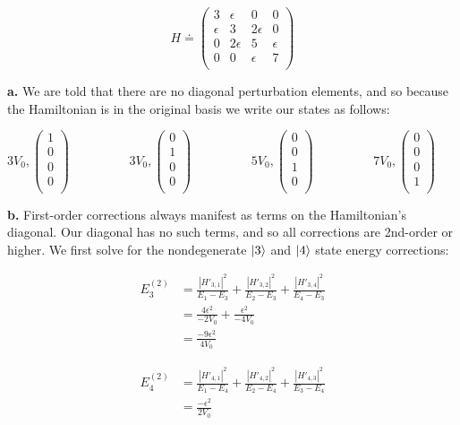 \documentclass[10pt]{article} %
\begin{document}
\begin{equation*}
  H \doteq
  \begin{pmatrix}
    3 & \epsilon & 0 & 0\\
    \epsilon & 3 & 2\epsilon & 0\\
    0 & 2\epsilon & 5 & \epsilon\\
    0 & 0 & \epsilon & 7\\
  \end{pmatrix}
\end{equation*}

\textbf{a.}
We are told that there are no diagonal perturbation elements, and so because the Hamiltonian is in
the original basis we write our states as follows:

\begin{equation*}
  3V_0,
  \begin{pmatrix}
    1 \\ 0 \\ 0 \\ 0\\
  \end{pmatrix}
  \hspace{2cm}
  3V_0,
  \begin{pmatrix}
    0 \\ 1 \\ 0 \\ 0\\
  \end{pmatrix}
  \hspace{2cm}
  5V_0,
  \begin{pmatrix}
    0 \\ 0 \\ 1 \\ 0\\
  \end{pmatrix}
  \hspace{2cm}
  7V_0,
  \begin{pmatrix}
    0 \\ 0 \\ 0 \\ 1\\
  \end{pmatrix}
  \hspace{2cm}
\end{equation*}

\textbf{b.}
First-order corrections always manifest as terms on the Hamiltonian's diagonal. Our diagonal has
no such terms, and so all corrections are 2nd-order or higher. We first solve for the nondegenerate
$\ket{3}$ and $\ket{4}$ state energy corrections:

\begin{align*}
  E_3^{(2)} &=
  \frac{|H'_{3,1}|^2}{E_1 - E_3} +
  \frac{|H'_{3,2}|^2}{E_2 - E_3} +
  \frac{|H'_{3,4}|^2}{E_4 - E_3}\\
  &= \frac{4\epsilon^2}{-2V_0} + \frac{\epsilon^2}{-4V_0}\\
  &= \frac{-9\epsilon^2}{4V_0}
\end{align*}

\begin{align*}
  E_4^{(2)} &=
  \frac{|H'_{4,1}|^2}{E_1 - E_4} +
  \frac{|H'_{4,2}|^2}{E_2 - E_4} +
  \frac{|H'_{4,3}|^2}{E_3 - E_4}\\
  &= \frac{-\epsilon^2}{2V_0}
\end{align*}
\end{document}
